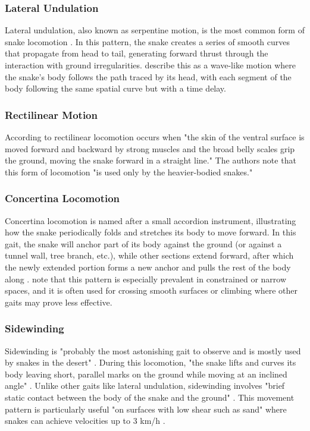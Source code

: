 \documentclass[12pt,a4paper]{report}
\begin{document}
\subsubsection{Lateral Undulation}
Lateral undulation, also known as serpentine motion, is the most common form of snake locomotion \textcite{liljeback-2013}. In this pattern, the snake creates a series of smooth curves that propagate from head to tail, generating forward thrust through the interaction with ground irregularities. \textcite{liljeback-2013} describe this as a wave-like motion where the snake's body follows the path traced by its head, with each segment of the body following the same spatial curve but with a time delay. 

\subsubsection{Rectilinear Motion}
According to \textcite{Zhenli2006} rectilinear locomotion occurs when "the skin of the ventral surface is moved forward and backward by strong muscles and the broad belly scales grip the ground, moving the snake forward in a straight line." The authors note that this form of locomotion "is used only by the heavier-bodied snakes."

\subsubsection{Concertina Locomotion} Concertina locomotion is named after a small accordion instrument, illustrating how the snake periodically folds and stretches its body to move forward. In this gait, the snake will anchor part of its body against the ground (or against a tunnel wall, tree branch, etc.), while other sections extend forward, after which the newly extended portion forms a new anchor and pulls the rest of the body along \cite{Zhenli2006}. note that this pattern is especially prevalent in constrained or narrow spaces, and it is often used for crossing smooth surfaces or climbing where other gaits may prove less effective.

\subsubsection{Sidewinding}
Sidewinding is "probably the most astonishing gait to observe and is mostly used by snakes in the desert" \cite{transeth-2009}. During this locomotion, "the snake lifts and curves its body leaving short, parallel marks on the ground while moving at an inclined angle" \cite{transeth-2009}. Unlike other gaits like lateral undulation, sidewinding involves "brief static contact between the body of the snake and the ground" \cite{transeth-2009}. This movement pattern is particularly useful "on surfaces with low shear such as sand" where snakes can achieve velocities up to 3 km/h \cite{transeth-2009}.
\end{document}
